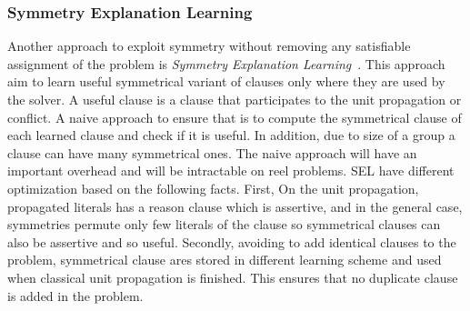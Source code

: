 \subsubsection{Symmetry Explanation Learning}

Another approach to exploit symmetry without removing any satisfiable assignment of the problem
is \emph{Symmetry Explanation Learning}~\cite{devriendt2017symmetric}. This approach aim to learn useful 
symmetrical variant of clauses only where they are used by the solver. A useful clause is a clause that participates
to the unit propagation or conflict. 
A naive approach to ensure that is to compute the symmetrical clause of 
each learned clause and check if it is useful. In addition, due to size of a group a clause can have many 
symmetrical ones. The naive approach will have an important overhead and will be intractable on reel problems.
SEL have different optimization based on the following facts. First,
On the unit propagation, propagated literals has a reason clause which is assertive, and in the general case,
 symmetries permute only few literals of the clause so symmetrical clauses can also be assertive and so useful.
Secondly, avoiding to add identical clauses to the problem, symmetrical clause ares stored in different learning scheme and used when classical unit propagation is finished. This ensures that no duplicate clause is added in the problem.
  
 


%

